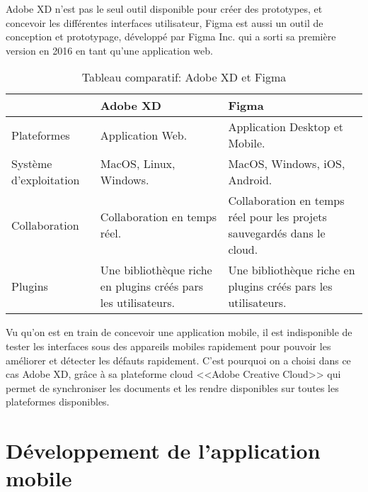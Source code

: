 Adobe XD n'est pas le seul outil disponible pour créer des prototypes, et concevoir les différentes interfaces utilisateur, Figma\cite{figma} est aussi un outil de conception et prototypage, développé par Figma Inc. qui a sorti sa première version en 2016 en tant qu'une application web.
\begin{table}[H]
    \begin{center}
        \begin{tabularx}{\textwidth}{| >{\centering\arraybackslash}X
                | >{\centering\arraybackslash}X
                | >{\centering\arraybackslash}X |}
            \hline
                                   & Adobe XD                                                       & Figma                                                                   \\
            \hline
            Plateformes            & Application Web.                                               & Application Desktop et Mobile.                                          \\
            \hline
            Système d'exploitation & MacOS, Linux, Windows.                                         & MacOS, Windows, iOS, Android.                                           \\
            \hline
            Collaboration          & Collaboration en temps réel.                                   & Collaboration en temps réel pour les projets sauvegardés dans le cloud. \\
            \hline
            Plugins                & Une bibliothèque riche en plugins créés pars les utilisateurs. & Une bibliothèque riche en plugins créés pars les utilisateurs.          \\
            \hline
        \end{tabularx}
        \captionsetup{justification=centering}
        \caption{Tableau comparatif: Adobe XD et Figma}
        \label{compare_adobexd_figme}
    \end{center}
\end{table}
Vu qu'on est en train de concevoir une application mobile, il est indisponible de tester les interfaces sous des appareils mobiles rapidement pour pouvoir les améliorer et détecter les défauts rapidement. C'est pourquoi on a choisi dans ce cas Adobe XD, grâce à sa plateforme cloud <<Adobe Creative Cloud>> qui permet de synchroniser les documents et les rendre disponibles sur toutes les plateformes disponibles.
\section{Développement de l'application mobile}
